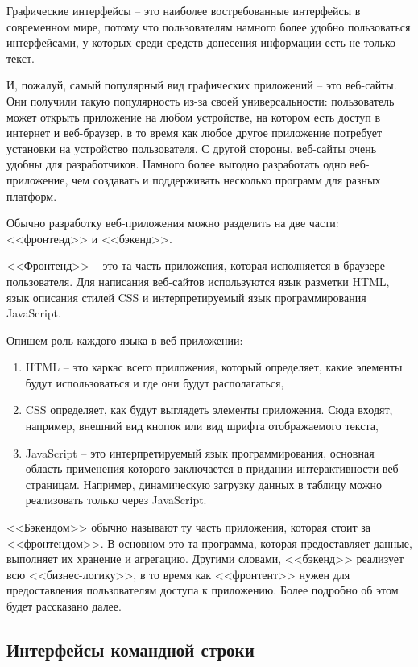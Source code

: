 Графические интерфейсы -- это наиболее востребованные интерфейсы в современном мире, потому
что пользователям намного более удобно пользоваться интерфейсами, у которых среди
средств донесения информации есть не только текст. 

И, пожалуй, самый популярный вид графических приложений -- это веб-сайты.
Они получили такую популярность из-за своей универсальности: пользователь
может открыть приложение на любом устройстве, на котором есть доступ в интернет
и веб-браузер, в то время как любое другое приложение потребует установки
на устройство пользователя. С другой стороны, веб-сайты очень удобны для
разработчиков. Намного более выгодно разработать одно веб-приложение, чем
создавать и поддерживать несколько программ для разных платформ.

Обычно разработку веб-приложения можно разделить на две части:
<<фронтенд>> и <<бэкенд>>.

<<Фронтенд>> -- это та часть приложения, которая исполняется в браузере пользователя.
Для написания веб-сайтов используются язык разметки HTML, язык описания стилей CSS и интерпретируемый
язык программирования JavaScript.

Опишем роль каждого языка в веб-приложении:
\begin{enumerate}
    \item HTML -- это каркас всего приложения, который определяет, какие элементы будут использоваться и
    где они будут располагаться,
    \item CSS определяет, как будут выглядеть элементы приложения. Сюда входят, например, внешний вид кнопок
    или вид шрифта отображаемого текста,
    \item JavaScript -- это интерпретируемый язык программирования, основная область применения которого заключается
    в придании интерактивности веб-страницам. Например, динамическую загрузку данных в таблицу можно реализовать только
    через JavaScript. 
    
\end{enumerate}

<<Бэкендом>> обычно называют ту часть приложения, которая стоит за <<фронтендом>>. В основном это
та программа, которая предоставляет данные, выполняет их хранение и агрегацию. Другими словами,
<<бэкенд>> реализует всю <<бизнес-логику>>, в то время как <<фронтент>> нужен для предоставления
пользователям доступа к приложению. Более подробно об этом будет рассказано далее.

\subsection*{Интерфейсы командной строки}

